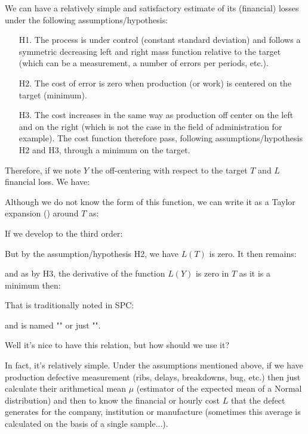 	We can have a relatively simple and satisfactory estimate of its (financial) losses under the following assumptions/hypothesis:
	\begin{enumerate}
		\item[H1.] The process is under control (constant standard deviation) and follows a symmetric decreasing left and right mass function relative to the target (which can be a measurement, a number of errors per periods, etc.).
		\item[H2.] The cost of error is zero when production (or work) is centered on the target (minimum).
		
		 \item[H3.] The cost increases in the same way as production off center on the left and on the right (which is not the case in the field of administration for example). The cost function therefore pass, following assumptions/hypothesis H2 and H3, through a minimum on the target.
	\end{enumerate}
	Therefore, if we note  $Y$ the off-centering with respect to the target $T$ and $L$ financial loss. We have:
	
	Although we do not know the form of this function, we can write it as a Taylor expansion () around $T$ as:
	
	If we develop to the third order:
		
	But by the assumption/hypothesis H2, we have $L (T)$ is zero. It then remains:
	
	and as by H3, the derivative of the function $L (Y)$ is zero in $T$ as it is a minimum then:
	
	That is traditionally noted in SPC:
	
	and is named "" or just "".
	
	Well it's nice to have this relation, but how should we use it?
	
	In fact, it's relatively simple. Under the assumptions mentioned above, if we have production defective measurement (ribs, delays, breakdowns, bug, etc.) then just calculate their arithmetical mean $\mu$ (estimator of the expected mean of a Normal distribution) and then to know the financial or hourly cost $L$ that the defect generates for the company, institution or manufacture (sometimes this average is calculated on the basis of a single sample...).
	

